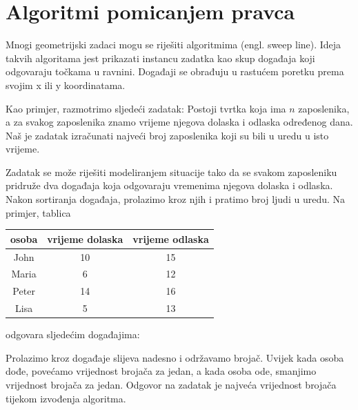 \chapter{Algoritmi pomicanjem pravca}


Mnogi geometrijski zadaci mogu se riješiti
algoritmima  (engl. sweep line).
Ideja takvih algoritama jest prikazati
instancu zadatka kao skup događaja koji odgovaraju
točkama u ravnini.
Događaji se obrađuju u rastućem poretku
prema svojim x ili y koordinatama.

Kao primjer, razmotrimo sljedeći zadatak:
Postoji tvrtka koja ima $n$ zaposlenika,
a za svakog zaposlenika znamo vrijeme njegova dolaska i
odlaska određenog dana.
Naš je zadatak izračunati najveći broj
zaposlenika koji su bili u uredu u isto vrijeme.

Zadatak se može riješiti modeliranjem situacije
tako da se svakom zaposleniku pridruže dva događaja koja
odgovaraju vremenima njegova dolaska i odlaska.
Nakon sortiranja događaja, prolazimo kroz njih
i pratimo broj ljudi u uredu.
Na primjer, tablica
\begin{center}
\begin{tabular}{ccc}
osoba & vrijeme dolaska & vrijeme odlaska \\
\hline
John & 10 & 15 \\
Maria & 6 & 12 \\
Peter & 14 & 16 \\
Lisa & 5 & 13 \\
\end{tabular}
\end{center}
odgovara sljedećim događajima:
\begin{center}
\end{center}
Prolazimo kroz događaje slijeva nadesno
i održavamo brojač.
Uvijek kada osoba dođe, povećamo
vrijednost brojača za jedan,
a kada osoba ode,
smanjimo vrijednost brojača za jedan.
Odgovor na zadatak je najveća
vrijednost brojača tijekom izvođenja algoritma.

